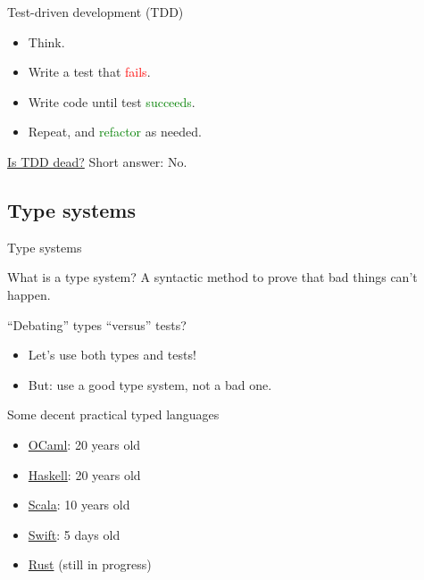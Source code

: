 \begin{frame}{Test-driven development (TDD)}
  \begin{itemize}
  \item Think.
  \item Write a test that \textcolor{red}{fails}.
  \item Write code until test \textcolor{green}{succeeds}.
  \item Repeat, and \textcolor{green}{refactor} as needed.
  \end{itemize}

  \begin{block}{\href{http://martinfowler.com/articles/is-tdd-dead/}{Is TDD dead?}}
    Short answer: No.
  \end{block}
\end{frame}

\subsection{Type systems}

\begin{frame}{Type systems}
  \begin{block}{What is a type system?}
    A \alert{syntactic} method to \alert{prove} that bad things can't happen.
  \end{block}

  \begin{block}{``Debating'' types ``versus'' tests?}
    \begin{itemize}
    \item Let's use both types and tests!
    \item But: use a \alert{good} type system, not a bad one.
    \end{itemize}
  \end{block}

  \begin{block}{Some decent practical typed languages}
    \begin{itemize}
    \item \href{http://swift.org/}{OCaml}: 20 years old
    \item \href{http://www.haskell.org/}{Haskell}: 20 years old
    \item \href{http://www.scala-lang.org/}{Scala}: 10 years old
    \item \href{http://developer.apple.com/swift/}{Swift}: 5 days old
    \item \href{http://www.rust-lang.org/}{Rust} (still in progress)
    \end{itemize}
  \end{block}
\end{frame}

